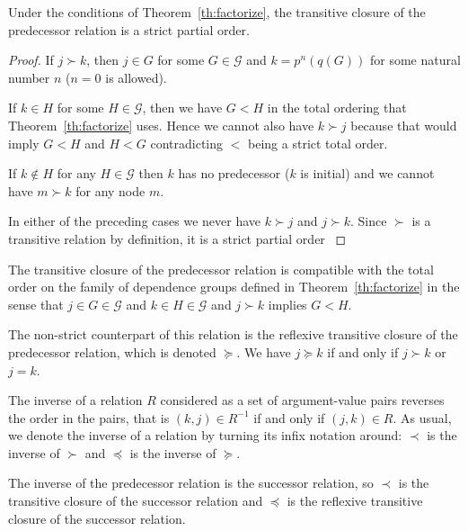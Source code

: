 \begin{theorem} \label{th:transitive-closure}
Under the conditions of Theorem~\ref{th:factorize},
the transitive closure of the predecessor relation is a strict partial order.
\end{theorem}
\begin{proof}
If $j \succ k$, then $j \in G$ for some $G \in \mathcal{G}$ and
$k = p^n(q(G))$ for some natural number $n$ ($n = 0$ is allowed).

If $k \in H$ for some $H \in \mathcal{G}$,
then we have $G < H$ in the total ordering
that Theorem~\ref{th:factorize} uses.
Hence we cannot also have $k \succ j$ because that would imply $G < H$
and $H < G$ contradicting $<$ being a strict total order.

If $k \notin H$ for any $H \in \mathcal{G}$ then $k$ has no predecessor
($k$ is initial) and we cannot have $m \succ k$ for any node $m$.

In either of the preceding cases we never have $k \succ j$ and $j \succ k$.
Since $\succ$ is a transitive relation by definition, it is
a strict partial order \citep[Section~14]{halmos-set-theory}
\end{proof}
\begin{corollary} \label{cor:compatible}
The transitive closure of the predecessor relation is compatible with
the total order on the family of dependence groups defined
in Theorem~\ref{th:factorize} in the sense that
$j \in G \in \mathcal{G}$ and $k \in H \in \mathcal{G}$ and $j \succ k$
implies $G < H$.
\end{corollary}

The non-strict counterpart of this relation
is the reflexive transitive closure of the predecessor relation,
which is denoted $\succeq$.
We have $j \succeq k$ if and only if $j \succ k$ or $j = k$.

The inverse of a relation $R$ considered as a set of argument-value pairs
reverses the order in the pairs, that is $(k, j) \in R^{- 1}$ if and only
if $(j, k) \in R$.
As usual, we denote the inverse of a relation by turning its infix notation
around: $\prec$ is the inverse of $\succ$ and $\preceq$ is the inverse
of $\succeq$.

The inverse of the predecessor relation is the successor relation,
so $\prec$ is the transitive closure of the successor relation
and $\preceq$ is the reflexive transitive closure of the successor relation.

